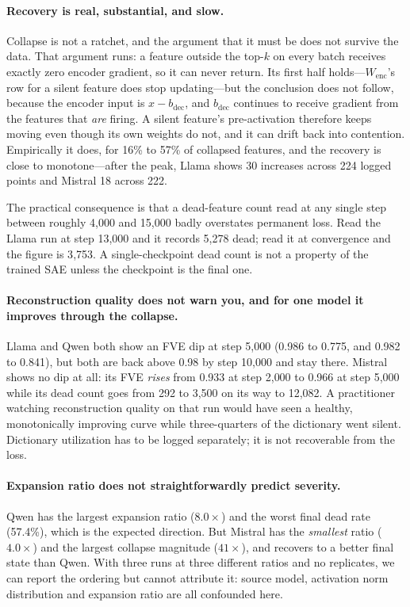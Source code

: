 \documentclass[11pt]{article}
\begin{document}
\paragraph{Recovery is real, substantial, and slow.} Collapse is not a ratchet, and the
argument that it must be does not survive the data. That argument runs: a feature outside
the top-$k$ on every batch receives exactly zero encoder gradient, so it can never return.
Its first half holds---$W_{\mathrm{enc}}$'s row for a silent feature does stop
updating---but the conclusion does not follow, because the encoder input is
$x - b_{\mathrm{dec}}$, and
$b_{\mathrm{dec}}$ continues to receive gradient from the features that \emph{are}
firing. A silent feature's pre-activation therefore keeps moving even though its own
weights do not, and it can drift back into contention. Empirically it does, for 16\% to
57\% of collapsed features, and the recovery is close to monotone---after the peak,
Llama shows 30 increases across 224 logged points and Mistral 18 across 222.

The practical consequence is that a dead-feature count read at any single step between
roughly 4{,}000 and 15{,}000 badly overstates permanent loss. Read the Llama run at step
13{,}000 and it records 5{,}278 dead; read it at convergence and the figure is 3{,}753.
A single-checkpoint dead count is not a property of the trained SAE unless the checkpoint
is the final one.

\paragraph{Reconstruction quality does not warn you, and for one model it improves
through the collapse.} Llama and Qwen both show an FVE dip at step 5{,}000 (0.986 to
0.775, and 0.982 to 0.841), but both are back above 0.98 by step 10{,}000 and stay
there. Mistral shows no dip at all: its FVE \emph{rises} from 0.933 at step 2{,}000 to
0.966 at step 5{,}000 while its dead count goes from 292 to 3{,}500 on its way to
12{,}082. A practitioner watching reconstruction quality on that run would have seen a
healthy, monotonically improving curve while three-quarters of the dictionary went
silent. Dictionary utilization has to be logged separately; it is not recoverable from
the loss.

\paragraph{Expansion ratio does not straightforwardly predict severity.} Qwen has the
largest expansion ratio ($8.0\times$) and the worst final dead rate (57.4\%), which is
the expected direction. But Mistral has the \emph{smallest} ratio ($4.0\times$) and the
largest collapse magnitude ($41\times$), and recovers to a better final state than Qwen.
With three runs at three different ratios and no replicates, we can report the ordering
but cannot attribute it: source model, activation norm distribution and expansion ratio
are all confounded here.
\end{document}
